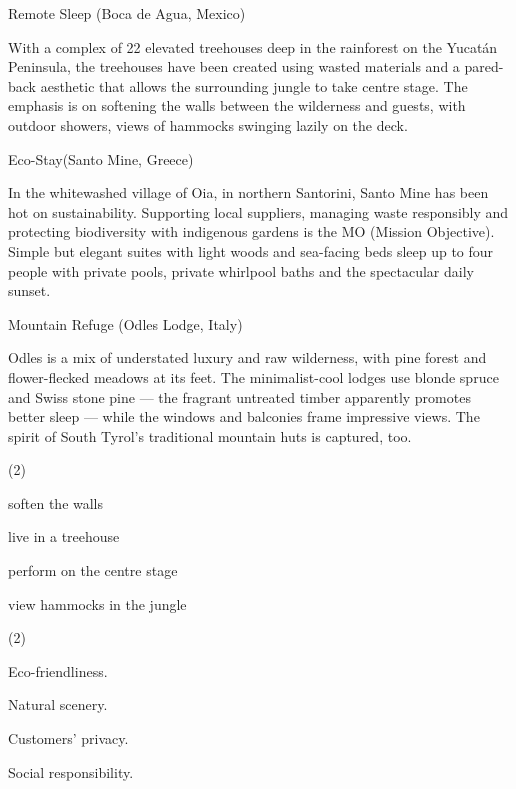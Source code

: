 \documentclass{英语试卷}
\begin{document}
\par Remote Sleep (Boca de Agua, Mexico)\par
\par With a complex of 22 elevated treehouses deep in the rainforest on the Yucatán Peninsula, the treehouses have been created using wasted materials and a pared-back aesthetic that allows the surrounding jungle to take centre stage. The emphasis is on softening the walls between the wilderness and guests, with outdoor showers, views of hammocks swinging lazily on the deck.\par
\par Eco-Stay(Santo Mine, Greece)\par
\par In the whitewashed village of Oia, in northern Santorini, Santo Mine has been hot on sustainability. Supporting local suppliers, managing waste responsibly and protecting biodiversity with indigenous gardens is the MO (Mission Objective). Simple but elegant suites with light woods and sea-facing beds sleep up to four people with private pools, private whirlpool baths and the spectacular daily sunset.\par
\par Mountain Refuge (Odles Lodge, Italy)\par
\par Odles is a mix of understated luxury and raw wilderness, with pine forest and flower-flecked meadows at its feet. The minimalist-cool lodges use blonde spruce and Swiss stone pine — the fragrant untreated timber apparently promotes better sleep — while the windows and balconies frame impressive views. The spirit of South Tyrol's traditional mountain huts is captured, too.\par
{}
\begin{choices}(2)
  \item soften the walls
  \item live in a treehouse
  \item perform on the centre stage
  \item view hammocks in the jungle
\end{choices}
\begin{choices}(2)
  \item Eco-friendliness.
  \item Natural scenery.
  \item Customers' privacy.
  \item Social responsibility.
\end{choices}
\end{document}
